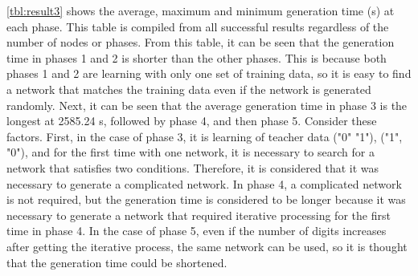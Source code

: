 \documentclass{article}
\begin{document}
\ref{tbl:result3} shows the average, maximum and minimum generation time (s) at each phase.
This table is compiled from all successful results regardless of the number of nodes or phases.
From this table, it can be seen that the generation time in phases 1 and 2 is shorter than the other phases.
This is because both phases 1 and 2 are learning with only one set of training data, so it is easy to find a network that matches the training data even if the network is generated randomly.
Next, it can be seen that the average generation time in phase 3 is the longest at 2585.24 s, followed by phase 4, and then phase 5.
Consider these factors.
First, in the case of phase 3, it is learning of teacher data ("0" "1"), ("1", "0"), and for the first time with one network, it is necessary to search for a network that satisfies two conditions. Therefore, it is considered that it was necessary to generate a complicated network.
In phase 4, a complicated network is not required, but the generation time is considered to be longer because it was necessary to generate a network that required iterative processing for the first time in phase 4.
In the case of phase 5, even if the number of digits increases after getting the iterative process, the same network can be used, so it is thought that the generation time could be shortened.
\end{document}

